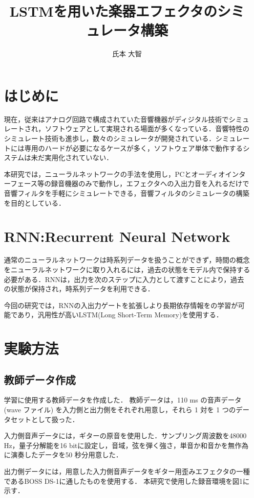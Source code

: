 \documentclass{jarticle}
\title{LSTMを用いた楽器エフェクタのシミュレータ構築} %
\author{氏本 大智}%
\begin{document}
%
\maketitle %

\section{はじめに}%
現在，従来はアナログ回路で構成されていた音響機器がディジタル技術でシミュレートされ，ソフトウェアとして実現される場面が多くなっている．音響特性のシミュレート技術も進歩し，数々のシミュレータが開発されている．シミュレートには専用のハードが必要になるケースが多く，ソフトウェア単体で動作するシステムは未だ実用化されていない．

本研究では，ニューラルネットワークの手法を使用し，PCとオーディオインターフェース等の録音機器のみで動作し，エフェクタへの入出力音を入れるだけで音響フィルタを手軽にシミュレートできる，音響フィルタのシミュレータの構築を目的としている．

\section{RNN:Recurrent Neural Network}
通常のニューラルネットワークは時系列データを扱うことができず，時間の概念をニューラルネットワークに取り入れるには，過去の状態をモデル内で保持する必要がある．RNNは，出力を次のステップに入力として渡すことにより，過去の状態が保持され，時系列データを利用できる．\cite{RNN}

今回の研究では，RNNの入出力ゲートを拡張しより長期依存情報をの学習が可能であり，汎用性が高いLSTM(Long Short-Term Memory)を使用する．

\section{実験方法}
\subsection{教師データ作成}
学習に使用する教師データを作成した．
教師データは，110 ms の音声データ (wave ファイル) を入力側と出力側をそれぞれ用意し，それら 1 対を 1 つのデータセットとして扱った．

入力側音声データには，ギターの原音を使用した．サンプリング周波数を48000 Hz，量子分解能を16 bitに設定し，音域，弦を弾く強さ，単音か和音かを無作為に演奏したデータを50 秒分用意した．

出力側データには，用意した入力側音声データをギター用歪みエフェクタの一種であるBOSS DS-1に通したものを使用する．
本研究で使用した録音環境を図1に示す．
\end{document}
